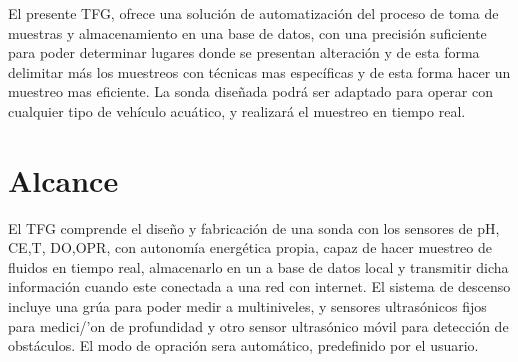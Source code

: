  
El presente TFG, ofrece una soluci\'on de automatizaci\'on del proceso de toma de muestras y almacenamiento en una base de datos, con una precisi\'on suficiente para poder determinar lugares donde se presentan alteraci\'on y de esta forma delimitar m\'as los muestreos con t\'ecnicas mas espec\'ificas y de esta forma hacer un muestreo mas eficiente.
La sonda diseñada podr\'a ser adaptado para operar con cualquier tipo de vehículo acu\'atico, y realizar\'a el muestreo en tiempo real.  

\section{Alcance}
El TFG comprende el dise\~no y fabricaci\'on de una sonda con los sensores de pH, CE,T, DO,OPR, con autonom\'ia energ\'etica propia, capaz de hacer muestreo de fluidos en tiempo real, almacenarlo en un a base de datos local y transmitir dicha información cuando este conectada a una red con internet. 
El sistema de descenso incluye una gr\'ua para poder medir a multiniveles, y sensores ultras\'onicos fijos para medici/'on de profundidad y otro sensor ultras\'onico m\'ovil para detección de obst\'aculos.  
El modo de opraci\'on sera autom\'atico, predefinido por el usuario.


